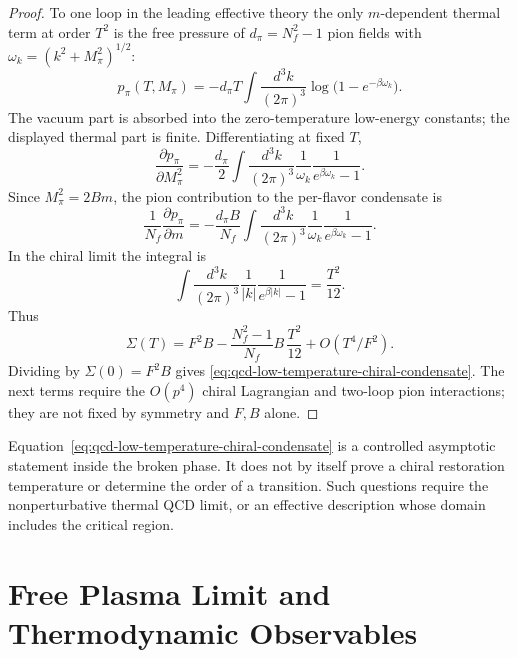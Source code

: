 \begin{proof}
To one loop in the leading effective theory the only \(m\)-dependent thermal
term at order \(T^2\) is the free pressure of
\(d_\pi=N_f^2-1\) pion fields with
\(\omega_k=(k^2+M_\pi^2)^{1/2}\):
\begin{equation}
  p_\pi(T,M_\pi)
  =
  -d_\pi T\int\frac{d^3k}{(2\pi)^3}
  \log\bigl(1-e^{-\beta\omega_k}\bigr).
  \label{eq:qcd-free-pion-pressure}
\end{equation}
The vacuum part is absorbed into the zero-temperature low-energy constants;
the displayed thermal part is finite.  Differentiating at fixed \(T\),
\begin{equation}
  \frac{\partial p_\pi}{\partial M_\pi^2}
  =
  -\frac{d_\pi}{2}
  \int\frac{d^3k}{(2\pi)^3}
  \frac{1}{\omega_k}\frac{1}{e^{\beta\omega_k}-1}.
  \label{eq:qcd-pion-pressure-mass-derivative}
\end{equation}
Since \(M_\pi^2=2Bm\), the pion contribution to the per-flavor condensate is
\[
  \frac1{N_f}\frac{\partial p_\pi}{\partial m}
  =
  -\frac{d_\pi B}{N_f}
  \int\frac{d^3k}{(2\pi)^3}
  \frac{1}{\omega_k}\frac{1}{e^{\beta\omega_k}-1}.
\]
In the chiral limit the integral is
\begin{equation}
  \int\frac{d^3k}{(2\pi)^3}
  \frac{1}{|k|}\frac{1}{e^{\beta |k|}-1}
  =
  \frac{T^2}{12}.
  \label{eq:qcd-massless-pion-tadpole}
\end{equation}
Thus
\[
  \Sigma(T)
  =
  F^2B-\frac{N_f^2-1}{N_f}B\,\frac{T^2}{12}
  +O(T^4/F^2).
\]
Dividing by \(\Sigma(0)=F^2B\) gives
\eqref{eq:qcd-low-temperature-chiral-condensate}.  The next terms require
the \(O(p^4)\) chiral Lagrangian and two-loop pion interactions; they are
not fixed by symmetry and \(F,B\) alone.
\end{proof}

\begin{remark}
Equation~\eqref{eq:qcd-low-temperature-chiral-condensate} is a controlled
asymptotic statement inside the broken phase.  It does not by itself prove a
chiral restoration temperature or determine the order of a transition.  Such
questions require the nonperturbative thermal QCD limit, or an effective
description whose domain includes the critical region.
\end{remark}

\section{Free Plasma Limit and Thermodynamic Observables}


